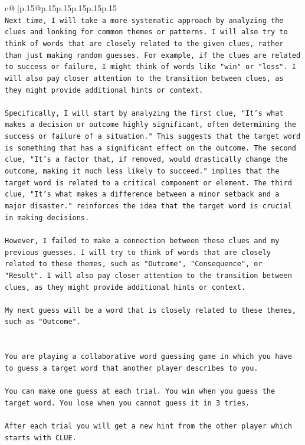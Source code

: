 \documentclass{article}
\begin{document}
{\begin{supertabular}{c@{$\;$}|p{.15\linewidth}@{}p{.15\linewidth}p{.15\linewidth}p{.15\linewidth}p{.15\linewidth}p{.15\linewidth}}
{{{\\ 
\texttt{Next time, I will take a more systematic approach by analyzing the clues and looking for common themes or patterns. I will also try to think of words that are closely related to the given clues, rather than just making random guesses. For example, if the clues are related to success or failure, I might think of words like "win" or "loss". I will also pay closer attention to the transition between clues, as they might provide additional hints or context. } \\
\\ 
\texttt{Specifically, I will start by analyzing the first clue, "It's what makes a decision or outcome highly significant, often determining the success or failure of a situation." This suggests that the target word is something that has a significant effect on the outcome. The second clue, "It's a factor that, if removed, would drastically change the outcome, making it much less likely to succeed." implies that the target word is related to a critical component or element. The third clue, "It's what makes a difference between a minor setback and a major disaster." reinforces the idea that the target word is crucial in making decisions. } \\
\\ 
\texttt{However, I failed to make a connection between these clues and my previous guesses. I will try to think of words that are closely related to these themes, such as "Outcome", "Consequence", or "Result". I will also pay closer attention to the transition between clues, as they might provide additional hints or context. } \\
\\ 
\texttt{My next guess will be a word that is closely related to these themes, such as "Outcome".} \\
\\ 
\\ 
\texttt{You are playing a collaborative word guessing game in which you have to guess a target word that another player describes to you.} \\
\\ 
\texttt{You can make one guess at each trial. You win when you guess the target word. You lose when you cannot guess it in 3 tries.} \\
\\ 
\texttt{After each trial you will get a new hint from the other player which starts with CLUE.} \\
\\ 
}}}
\end{supertabular}}
\end{document}
